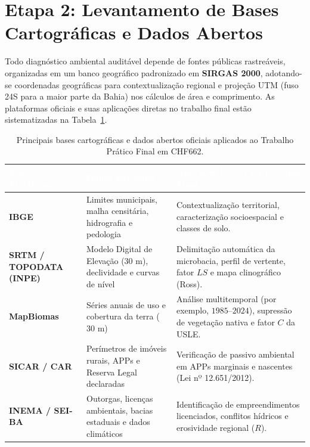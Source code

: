 \section{Etapa 2: Levantamento de Bases Cartográficas e Dados Abertos}

Todo diagnóstico ambiental auditável depende de fontes públicas rastreáveis, organizadas em um banco geográfico padronizado em \textbf{SIRGAS 2000}, adotando-se coordenadas geográficas para contextualização regional e projeção UTM (fuso 24S para a maior parte da Bahia) nos cálculos de área e comprimento. As plataformas oficiais e suas aplicações diretas no trabalho final estão sistematizadas na Tabela~\ref{tab:bases_abertas_tpf}.

\begin{table}[H]
\centering
\caption{Principais bases cartográficas e dados abertos oficiais aplicados ao Trabalho Prático Final em CHF662.}
\label{tab:bases_abertas_tpf}
\renewcommand{\arraystretch}{1.20}
\small
\begin{tabularx}{\textwidth}{@{}p{2.9cm} p{3.8cm} >{\raggedright\arraybackslash}X@{}}
  \toprule
  \rowcolor{uefsNavy}
  \textcolor{white}{\bfseries Base / Plataforma} & \textcolor{white}{\bfseries Dados Extraídos} & \textcolor{white}{\bfseries Aplicação Direta no Trabalho Final} \\
  \midrule
  \textbf{IBGE} & Limites municipais, malha censitária, hidrografia e pedologia & Contextualização territorial, caracterização socioespacial e classes de solo. \\
  \rowcolor{bgGray}
  \textbf{SRTM / TOPODATA (INPE)} & Modelo Digital de Elevação ($30\text{ m}$), declividade e curvas de nível & Delimitação automática da microbacia, perfil de vertente, fator $LS$ e mapa clinográfico (Ross). \\
  \textbf{MapBiomas} & Séries anuais de uso e cobertura da terra ($30\text{ m}$) & Análise multitemporal (por exemplo, $1985\text{--}2024$), supressão de vegetação nativa e fator $C$ da USLE. \\
  \rowcolor{bgGray}
  \textbf{SICAR / CAR} & Perímetros de imóveis rurais, APPs e Reserva Legal declaradas & Verificação de passivo ambiental em APPs marginais e nascentes (Lei nº 12.651/2012). \\
  \textbf{INEMA / SEI-BA} & Outorgas, licenças ambientais, bacias estaduais e dados climáticos & Identificação de empreendimentos licenciados, conflitos hídricos e erosividade regional ($R$). \\
  \bottomrule
\end{tabularx}
\end{table}

